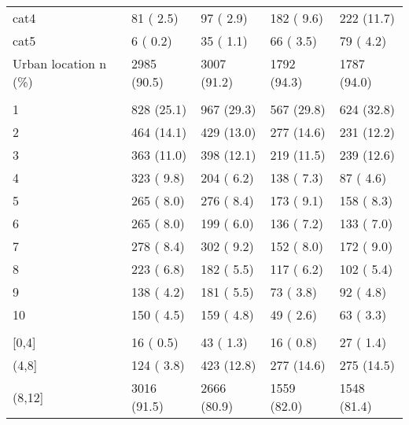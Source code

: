 \documentclass[
  a4paper,
  openany]{article}
\begin{document}
\begin{longtable}[t]{lllll}
\hspace{1em}cat4 & 81 ( 2.5) & 97 ( 2.9) & 182 ( 9.6) & 222 (11.7)\\
\rowcolor{gray!6}  \hspace{1em}cat5 & 6 ( 0.2) & 35 ( 1.1) & 66 ( 3.5) & 79 ( 4.2)\\
Urban location n (\%) & 2985 (90.5) & 3007 (91.2) & 1792 (94.3) & 1787 (94.0)\\
\rowcolor{gray!6}  \addlinespace[0.3em]
\multicolumn{5}{l}{\textbf{IMD decile n (\%)}}\\
\hspace{1em}1 & 828 (25.1) & 967 (29.3) & 567 (29.8) & 624 (32.8)\\
\hspace{1em}2 & 464 (14.1) & 429 (13.0) & 277 (14.6) & 231 (12.2)\\
\rowcolor{gray!6}  \hspace{1em}3 & 363 (11.0) & 398 (12.1) & 219 (11.5) & 239 (12.6)\\
\hspace{1em}4 & 323 ( 9.8) & 204 ( 6.2) & 138 ( 7.3) & 87 ( 4.6)\\
\rowcolor{gray!6}  \hspace{1em}5 & 265 ( 8.0) & 276 ( 8.4) & 173 ( 9.1) & 158 ( 8.3)\\
\hspace{1em}6 & 265 ( 8.0) & 199 ( 6.0) & 136 ( 7.2) & 133 ( 7.0)\\
\rowcolor{gray!6}  \hspace{1em}7 & 278 ( 8.4) & 302 ( 9.2) & 152 ( 8.0) & 172 ( 9.0)\\
\hspace{1em}8 & 223 ( 6.8) & 182 ( 5.5) & 117 ( 6.2) & 102 ( 5.4)\\
\rowcolor{gray!6}  \hspace{1em}9 & 138 ( 4.2) & 181 ( 5.5) & 73 ( 3.8) & 92 ( 4.8)\\
\hspace{1em}10 & 150 ( 4.5) & 159 ( 4.8) & 49 ( 2.6) & 63 ( 3.3)\\
\rowcolor{gray!6}  \addlinespace[0.3em]
\multicolumn{5}{l}{\textbf{Prevalence of Long-term conditions n (\%)}}\\
\hspace{1em}[0,4] & 16 ( 0.5) & 43 ( 1.3) & 16 ( 0.8) & 27 ( 1.4)\\
\hspace{1em}(4,8] & 124 ( 3.8) & 423 (12.8) & 277 (14.6) & 275 (14.5)\\
\rowcolor{gray!6}  \hspace{1em}(8,12] & 3016 (91.5) & 2666 (80.9) & 1559 (82.0) & 1548 (81.4)\\

\end{longtable}
\end{document}

